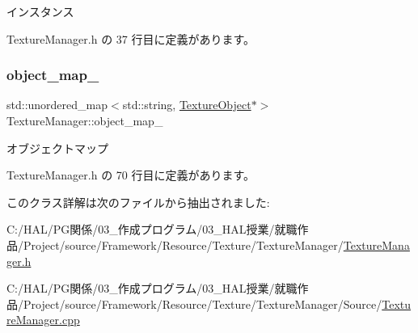 インスタンス 



 Texture\+Manager.\+h の 37 行目に定義があります。

\mbox{\label{class_texture_manager_a105e7936953e0907fc6a7b9c9734a01a}} 
\subsubsection{\texorpdfstring{object\+\_\+map\+\_\+}{object\_map\_}}
{\footnotesize\ttfamily std\+::unordered\+\_\+map$<$std\+::string, \mbox{\hyperlink{class_texture_object}{Texture\+Object}}$\ast$$>$ Texture\+Manager\+::object\+\_\+map\+\_\+\hspace{0.3cm}{\ttfamily [private]}}



オブジェクトマップ 



 Texture\+Manager.\+h の 70 行目に定義があります。



このクラス詳解は次のファイルから抽出されました\+:\begin{DoxyCompactItemize}
\item 
C\+:/\+H\+A\+L/\+P\+G関係/03\+\_\+作成プログラム/03\+\_\+\+H\+A\+L授業/就職作品/\+Project/source/\+Framework/\+Resource/\+Texture/\+Texture\+Manager/\mbox{\hyperlink{_texture_manager_8h}{Texture\+Manager.\+h}}\item 
C\+:/\+H\+A\+L/\+P\+G関係/03\+\_\+作成プログラム/03\+\_\+\+H\+A\+L授業/就職作品/\+Project/source/\+Framework/\+Resource/\+Texture/\+Texture\+Manager/\+Source/\mbox{\hyperlink{_texture_manager_8cpp}{Texture\+Manager.\+cpp}}\end{DoxyCompactItemize}
